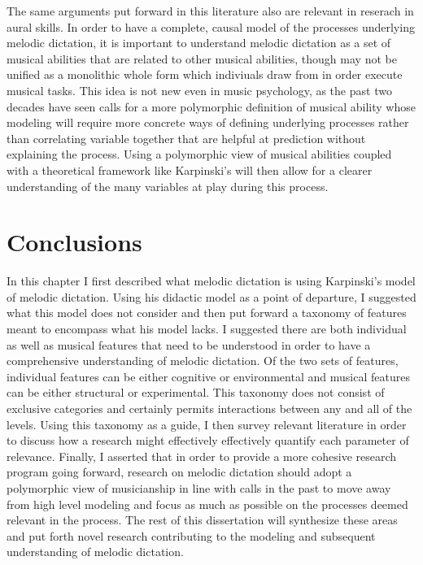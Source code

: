 \documentclass[]{book}
\begin{document}
The same arguments put forward in this literature also are relevant in reserach in aural skills.
In order to have a complete, causal model of the processes underlying melodic dictation, it is important to understand melodic dictation as a set of musical abilities that are related to other musical abilities, though may not be unified as a monolithic whole form which indiviuals draw from in order execute musical tasks.
This idea is not new even in music psychology, as the past two decades have seen calls for a more polymorphic definition of musical ability \citep{levitinWhatDoesIt2012, peretzModularityMusicProcessing2003} whose modeling will require more concrete ways of defining underlying processes rather than correlating variable together that are helpful at prediction without explaining the process.
Using a polymorphic view of musical abilities coupled with a theoretical framework like Karpinski's will then allow for a clearer understanding of the many variables at play during this process.

\hypertarget{conclusions}{%
\section{Conclusions}\label{conclusions}}

In this chapter I first described what melodic dictation is using Karpinski's model of melodic dictation.
Using his didactic model as a point of departure, I suggested what this model does not consider and then put forward a taxonomy of features meant to encompass what his model lacks.
I suggested there are both individual as well as musical features that need to be understood in order to have a comprehensive understanding of melodic dictation.
Of the two sets of features, individual features can be either cognitive or environmental and musical features can be either structural or experimental.
This taxonomy does not consist of exclusive categories and certainly permits interactions between any and all of the levels.
Using this taxonomy as a guide, I then survey relevant literature in order to discuss how a research might effectively effectively quantify each parameter of relevance.
Finally, I asserted that in order to provide a more cohesive research program going forward, research on melodic dictation should adopt a polymorphic view of musicianship in line with calls in the past to move away from high level modeling and focus as much as possible on the processes deemed relevant in the process.
The rest of this dissertation will synthesize these areas and put forth novel research contributing to the modeling and subsequent understanding of melodic dictation.
\end{document}
